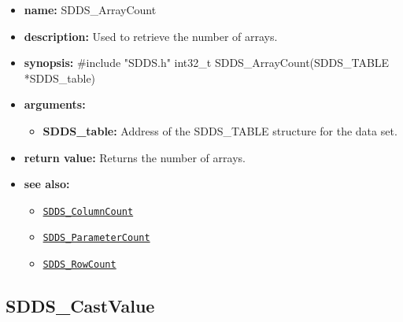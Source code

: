 \documentclass[11pt]{article}
\newcommand{\progref}[1]{\hyperref[SDDS_#1]{\tt SDDS\_#1}}
\begin{document}
\begin{itemize}
\item {\bf name:}\newline
SDDS\_ArrayCount
\item {\bf description:}\newline
Used to retrieve the number of arrays.
\item {\bf synopsis:} \#include "SDDS.h"\newline
int32\_t SDDS\_ArrayCount(SDDS\_TABLE *SDDS\_table)
\item {\bf arguments:}
\begin{itemize}
\item {\bf SDDS\_table:} Address of the SDDS\_TABLE structure for the data set.
\end{itemize}
\item {\bf return value:}\newline
Returns the number of arrays.
\item {\bf see also:}
\begin{itemize}
\item \progref{ColumnCount}
\item \progref{ParameterCount}
\item \progref{RowCount}
\end{itemize}
\end{itemize}

\subsection{SDDS\_CastValue}
\label{SDDS_CastValue}
\end{document}

